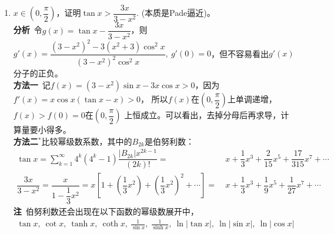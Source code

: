 \begin{enumerate}[label={【\textbf{例\thechapter.\arabic*}】},
 leftmargin=\inteval{\myenumleftmargin}pt,
 itemsep=\inteval{\myenumitempsep}pt,
 itemindent=\inteval{\myenumitemindent}pt]
\item $ x\in(0,\dfrac{\pi}{2}) $，证明$ \tan x>\dfrac{3x}{3-x^2} $.
(本质是Pade逼近)。 \\
\textbf{分析}\ 令$ g(x)=\tan x-\dfrac{3x}{3-x^2} $，则$ g'(x)=\dfrac{(3-x^2)^2-3(x^2+3)
    \cos^2 x}{(3-x^2)^2\cos^2 x},\ g'(0)=0 $，但不容易看出$ g'(x) $分子的正负。\\
\textbf{方法一}\ 记$ f(x)= (3-x^2)\sin x-3x\cos x>0 $，因为$ f'(x)=x\cos x(\tan x-x)>0 $，
所以$ f(x) $在$ (0,\dfrac{\pi}{2}) $上单调递增，$ f(x)>f(0)=0 $在$ (0,\dfrac{\pi}{2}) $
上恒成立。可以看出，去掉分母后再求导，计算量要小得多。\\
\textbf{方法二}$ ^* $比较幂级数系数，其中的$ B_{2k} $是伯努利数：
\begin{align*}
    \tan x =\sum_{k=1}^{\infty}4^k(4^k-1)\dfrac{|B_{2k}|x^{2k-1}}{(2k)!} =&\ 
    x+\dfrac{1}{3}x^3+\dfrac{2}{15}x^5+\dfrac{17}{315}x^7+\cdots  \\
    \dfrac{3x}{3-x^2} =\dfrac{x}{1-\dfrac{1}{3}x^2}=x\left[1+
    \left(\dfrac{1}{3}x^2\right)+\left(\dfrac{1}{3}x^2\right)^2+\cdots  \right] 
    =&\ x+\dfrac{1}{3}x^3+\dfrac{1}{9}x^5+\dfrac{1}{27}x^7+\cdots 
\end{align*}
\textbf{注}\ 伯努利数还会出现在以下函数的幂级数展开中，
\begin{gather*}
    \tan x,\ \cot x,\ \tanh x,\ \coth x,\ \frac{1}{\sin x},
    \ \frac{1}{\sinh x},\ \ln|\tan x|,\ \ln|\sin x|,\ \ln|\cos x|
\end{gather*}


\end{enumerate}

